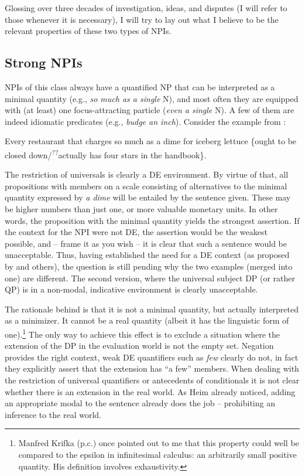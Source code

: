 \documentclass[output=paper,colorlinks,citecolor=brown,
]{langscibook}
\begin{document}
Glossing over three decades of investigation, ideas, and disputes (I will refer to those whenever it is necessary), I
will try to lay out what I believe to be the relevant properties of these two types of NPIs.

\subsection{Strong NPIs}

NPIs of this class always have a quantified NP that can be interpreted as a minimal quantity (e.g.,
\textit{so much as a single} N), and most often they are equipped with (at least) one
focus-attracting particle (\textit{even a single} N). A few of them are indeed idiomatic predicates
(e.g., \textit{budge an inch}). Consider the example from \citet[104]{heim1984}:

\ea \label{neubarthex:everyrestaurant}
\glt Every restaurant that charges so much as a dime for iceberg lettuce \{ought to be closed down\slash\textsuperscript{??}actually has four stars in the
     handbook\}.
\z


The restriction of universals is clearly a DE environment. By virtue of that, all propositions with members on a scale
consisting of alternatives to the minimal quantity expressed by \textit{a dime} will be entailed by the sentence given.
These may be higher numbers than just one, or more valuable monetary units. In other words, the proposition with the
minimal quantity yields the strongest assertion. If the context for the NPI were not DE, the assertion would be the
weakest possible, and -- frame it as you wish -- it is clear that such a sentence would be unacceptable. Thus, having
established the need for a DE context (as proposed by \citet{ladusaw1979} and others), the question is still
pending why the two examples (merged into one) are different. The second version, where the universal subject DP (or rather QP) is in
a non-modal, indicative environment is clearly unacceptable.

The rationale behind is that it is not a minimal quantity, but actually interpreted as a minimizer. It cannot be a real
quantity (albeit it has the linguistic form of one).\footnote{Manfred Krifka (p.c.) once pointed out to me that this
property could well be compared to the epsilon in infinitesimal calculus: an arbitrarily small positive quantity. His
definition \citep[in][]{krifka1995} involves exhaustivity.} The only way to achieve this effect is to exclude a situation
where the extension of the DP in the evaluation world is not the empty set. Negation provides the right context, weak
DE quantifiers such as \textit{few} clearly do not, in fact they explicitly assert that the extension has ``a few''
members. When dealing with the restriction of universal quantifiers or antecedents of conditionals it is not clear
whether there is an extension in the real world. As Heim already noticed, adding an appropriate modal to the sentence
already does the job -- prohibiting an inference to the real world.
\end{document}
